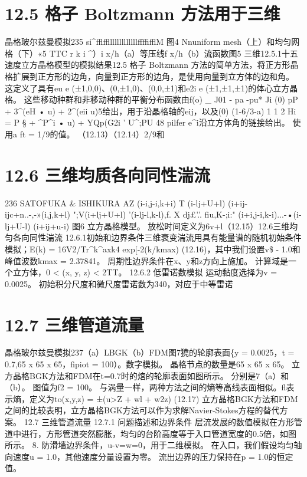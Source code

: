 \documentclass[UTF8,11pt,a4paper,openany,fontset=fandol]{ctexbook}
\begin{document}
\section{12.5 格子 Boltzmann 方法用于三维}
晶格玻尔兹曼模拟235 si\textasciicircum{}fflfflllllllllllllffffifflM 图4 Nnuniform mesh（上）和均匀网格（下）«5 TTC r k i \textasciicircum{}）i x/h（a）等压线f x/h（b）流函数图5 三维12.5.1十五速度立方晶格模型的模拟结果12.5 格子 Boltzmann 方法的简单方法，将正方形晶格扩展到正方形的边角，向量到正方形的边角，是使用向量到立方体的边和角。 这定义了具有eu e (±1,0,0)、(0,±1,0)、(0,0,±1)和e2i e (±1,±1,±1)的体心立方晶格。 这些移动种群和非移动种群的平衡分布函数由f(o) \_ J01 - pa -pu* Ji (0) pP + 3\textasciicircum{}(eH • u) + 2\textasciicircum{}(eii u)5给出，用于沿晶格轴的eij，以及(0) (1-6/3-a) 1 1 2 Hi = P § + \textasciicircum{}P\textasciicircum{}i • u) + YQp(G2i ' U\textasciicircum{};PU 48 pilfer e\textasciicircum{}i沿立方体角的链接给出。 使用a ft = 1/9的值。 （12.13）（12.14）2/9和

\section{12.6 三维均质各向同性湍流}
236 SATOFUKA \& ISHIKURA AZ (i-i,j-i,k+i) T (i-lj+U+l) (i+ij-ijc+n..-,-»(i,j,k+l) ";V(i+lj+U+l) '(i-lj-l,k-l),f. X dj£'.'. fiu,K-;i:" (i+i,j-i,k-i)...-•(i-lj+U-l) (i+ij+u-i) 图6 立方晶格模型。 放松时间定义为6v+l（12.15）12.6三维均匀各向同性湍流 12.6.1初始和边界条件三维衰变湍流用具有能量谱的随机初始条件模拟；E(k) = 16V2/Tr\textasciicircum{}k\textasciicircum{}axk4 exp[-2(k/kmax) (12.16)，其中我们设置v\$ - 1.0和峰值波数kmax = 2.37841。 周期性边界条件在x、y和z方向上施加。 计算域是一个立方体，0 < (x, y, z) < 2TT。 12.6.2 低雷诺数模拟 运动黏度选择为v = 0.0025。 初始积分尺度和微尺度雷诺数为340，对应于中等雷诺

\section{12.7 三维管道流量}
晶格玻尔兹曼模拟237（a）LBGK（b）FDM图7獟的轮廓表面\{y = 0.0025，t = 0.7,65 x 65 x 65，fipiot = 100）。数字模拟。 晶格节点的数量是65 x 65 x 65。 立方晶格BGK方法和FDM在t=0.7时的熍的轮廓表面如图所示。 分别是7（a）和（b）。 图值为f2 = 100。 与涡量一样，两种方法之间的熵等高线表面相似。fl表示熵，定义为to(x,y,z) = ±(u>Z + wl + w2z) (12.17) 立方晶格BGK方法和FDM之间的比较表明，立方晶格BGK方法可以作为求解Navier-Stokes方程的替代方案。 12.7 三维管道流量 12.7.1 问题描述和边界条件 层流发展的数值模拟在方形管道中进行，方形管道突然膨胀，均匀的台阶高度等于入口管道宽度的0.5倍，如图所示。 8. 防滑墙边界条件，u-v=w=0，用于二维模拟。 在入口，我们假设均匀轴向速度u = 1.0，其他速度分量设置为零。 流出边界的压力保持在p = 1.0的恒定值。
\end{document}
